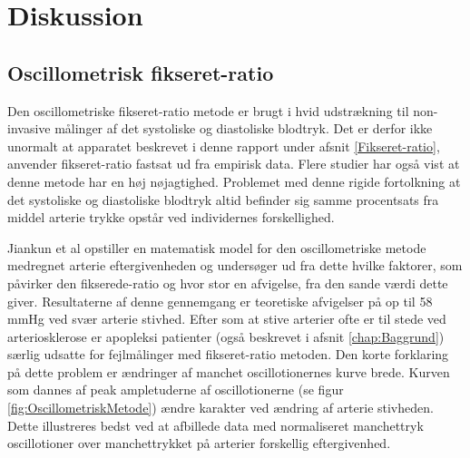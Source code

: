 \chapter{Diskussion}

\section{Oscillometrisk fikseret-ratio}
Den oscillometriske fikseret-ratio metode er brugt i hvid udstrækning til non-invasive målinger af det systoliske og diastoliske blodtryk. Det er derfor ikke unormalt at apparatet beskrevet i denne rapport under afsnit \ref{Fikseret-ratio}, anvender fikseret-ratio fastsat ud fra empirisk data. Flere studier har også vist at denne metode har en høj nøjagtighed. Problemet med denne rigide fortolkning at det systoliske og diastoliske blodtryk altid befinder sig samme procentsats fra middel arterie trykke opstår ved individernes forskellighed.

Jiankun et al opstiller en matematisk model for den oscillometriske metode medregnet arterie eftergivenheden og undersøger ud fra dette hvilke faktorer, som påvirker den fikserede-ratio og hvor stor en afvigelse, fra den sande værdi dette giver. Resultaterne af denne gennemgang er teoretiske afvigelser på op til 58 mmHg ved svær arterie stivhed. Efter som at stive arterier ofte er til stede ved  arteriosklerose er apopleksi patienter (også beskrevet i afsnit \ref{chap:Baggrund}) særlig udsatte for fejlmålinger med fikseret-ratio metoden. Den korte forklaring på dette problem er ændringer af manchet oscillotionernes kurve brede. Kurven som dannes af peak ampletuderne af oscillotionerne (se figur \ref{fig:OscillometriskMetode}) ændre karakter ved ændring af arterie stivheden. Dette illustreres bedst ved at afbillede data med normaliseret manchettryk oscillotioner over manchettrykket på arterier forskellig eftergivenhed. 

